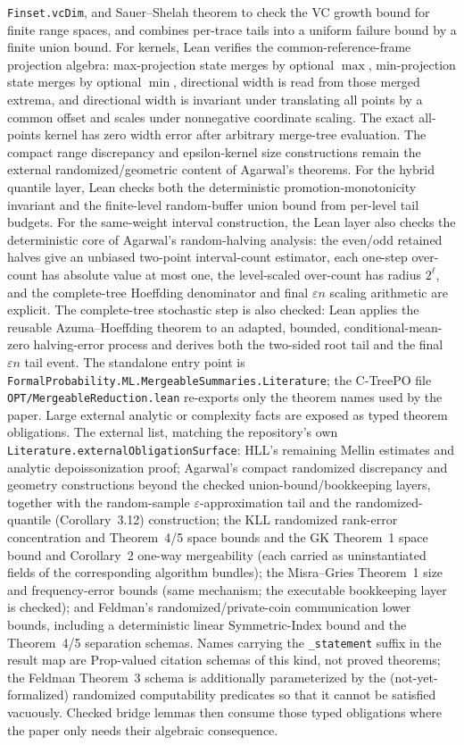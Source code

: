 \texttt{Finset.vcDim}, and Sauer--Shelah theorem to check the VC growth
bound for finite range spaces, and combines per-trace tails into a uniform
failure bound by a finite union bound.
For kernels, Lean verifies the common-reference-frame projection algebra:
max-projection state merges by optional \(\max\), min-projection state merges
by optional \(\min\), directional width is read from those merged extrema, and
directional width is invariant under translating all points by a common offset
and scales under nonnegative coordinate scaling.
The exact all-points
kernel has zero width error after arbitrary merge-tree evaluation.  The compact
range discrepancy and epsilon-kernel size constructions remain the external
randomized/geometric content of Agarwal's theorems.
For the hybrid quantile layer, Lean checks both the deterministic
promotion-monotonicity invariant and the finite-level random-buffer union bound
from per-level tail budgets.
For the same-weight interval construction, the Lean layer also checks the
deterministic core of Agarwal's random-halving analysis: the even/odd retained
halves give an unbiased two-point interval-count estimator, each one-step
over-count has absolute value at most one, the level-scaled over-count has
radius \(2^\ell\), and the complete-tree Hoeffding denominator and final
\(\varepsilon n\) scaling arithmetic are explicit. The complete-tree stochastic
step is also checked: Lean applies the reusable Azuma--Hoeffding theorem to an
adapted, bounded, conditional-mean-zero halving-error process and derives both
the two-sided root tail and the final \(\varepsilon n\) tail event.
The standalone entry point is
\texttt{FormalProbability.ML.MergeableSummaries.Literature}; the C-TreePO file
\texttt{OPT/MergeableReduction.lean} re-exports only the theorem names used by
the paper. Large external analytic or complexity facts are exposed as typed
theorem obligations. The external list, matching the repository's own
\texttt{Literature.externalObligationSurface}: HLL's remaining Mellin
estimates and analytic depoissonization proof; Agarwal's compact randomized
discrepancy and geometry constructions beyond the checked
union-bound/bookkeeping layers, together with the random-sample
\(\varepsilon\)-approximation tail and the randomized-quantile
(Corollary~3.12) construction; the KLL randomized rank-error concentration
and Theorem~4/5 space bounds and the GK Theorem~1 space bound and
Corollary~2 one-way mergeability (each carried as uninstantiated fields of
the corresponding algorithm bundles); the Misra--Gries Theorem~1 size and
frequency-error bounds (same mechanism; the executable bookkeeping layer is
checked); and Feldman's randomized/private-coin communication lower bounds,
including a deterministic linear Symmetric-Index bound and the Theorem~4/5
separation schemas. Names carrying the \texttt{\_statement} suffix in the
result map are Prop-valued citation schemas of this kind, not proved
theorems; the Feldman Theorem~3 schema is additionally parameterized by the
(not-yet-formalized) randomized computability predicates so that it cannot
be satisfied vacuously.
Checked bridge lemmas then consume those typed obligations where the paper only
needs their algebraic consequence.

